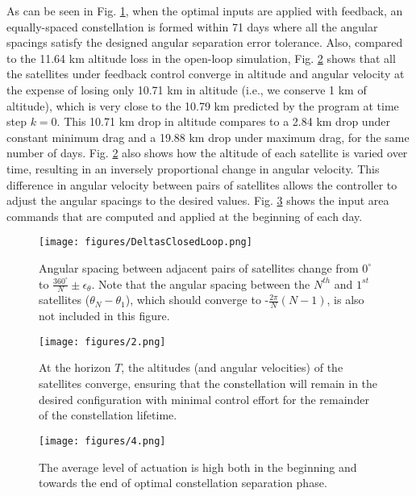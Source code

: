 \documentclass[letterpaper, 10 pt, conference]{ieeeconf}  %
\begin{document}
As can be seen in Fig. \ref{fig:spacinghorizon}, when the optimal inputs are applied with feedback, an equally-spaced constellation is formed within 71 days where all the angular spacings satisfy the designed angular separation error tolerance. Also, compared to the 11.64 km altitude loss in the open-loop simulation, Fig. \ref{fig:stateshorizon} shows that all the satellites under feedback control converge in altitude and angular velocity at the expense of losing only 10.71 km in altitude (i.e., we conserve 1 km of altitude), which is very close to the 10.79 km predicted by the program at time step $k=0$. This 10.71 km drop in altitude compares to a 2.84 km drop under constant minimum drag and a 19.88 km drop under maximum drag, for the same number of days. Fig. \ref{fig:stateshorizon} also shows how the altitude of each satellite is varied over time, resulting in an inversely proportional change in angular velocity. This difference in angular velocity between pairs of satellites allows the controller to adjust the angular spacings to the desired values. Fig. \ref{fig:inputshorizon} shows the input area commands that are computed and applied at the beginning of each day. 
\begin{figure}[h]
\centering
\texttt{[image: figures/DeltasClosedLoop.png]}
\caption{Angular spacing between adjacent pairs of satellites change from $0^{\circ}$ to $\tfrac{360^{\circ}}{N} \pm \epsilon_{\theta}$. Note that the angular spacing between the $N^{th}$ and $1^{st}$ satellites ($\theta_N - \theta_1$), which should converge to -$\frac{2\pi}{N}(N-1)$, is also not included in this figure.}
\label{fig:spacinghorizon}
\end{figure}

\begin{figure}[h]
\centering
\texttt{[image: figures/2.png]}
\caption{At the horizon $T$, the altitudes (and angular velocities) of the satellites converge, ensuring that the constellation will remain in the desired configuration with minimal control effort for the remainder of the constellation lifetime.}
\label{fig:stateshorizon}
\end{figure}

\begin{figure}[h]
\centering
\texttt{[image: figures/4.png]}
\caption{The average level of actuation is high both in the beginning and towards the end of optimal constellation separation phase.}
\label{fig:inputshorizon}
\end{figure}
\end{document}
